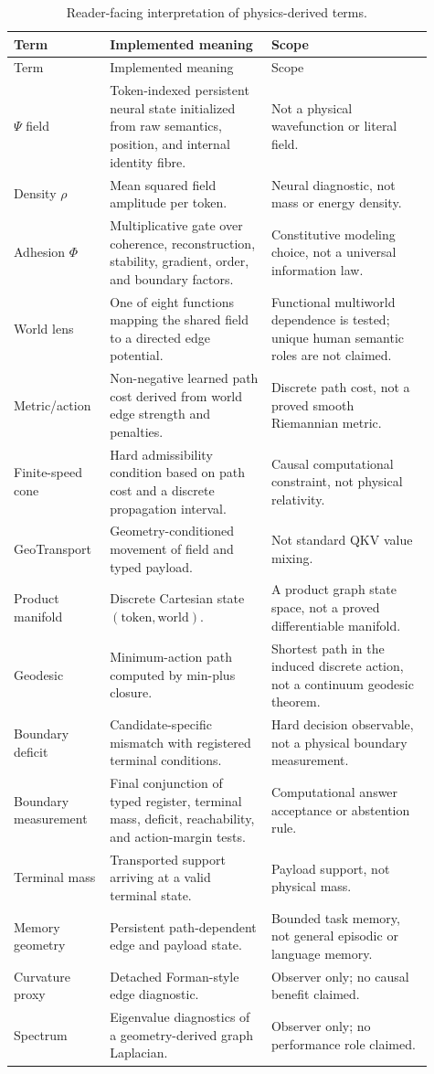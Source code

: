 \documentclass[11pt]{article}
\begin{document}
\begin{longtable}{@{}P{0.19\linewidth}P{0.36\linewidth}P{0.36\linewidth}@{}}
\caption{Reader-facing interpretation of physics-derived terms.}
\label{tab:glossary}\\
\toprule
Term & Implemented meaning & Scope \\
\midrule
\endfirsthead
\toprule
Term & Implemented meaning & Scope \\
\midrule
\endhead
$\Psi$ field & Token-indexed persistent neural state initialized from raw
semantics, position, and internal identity fibre. & Not a physical wavefunction
or literal field. \\
Density $\rho$ & Mean squared field amplitude per token. & Neural diagnostic,
not mass or energy density. \\
Adhesion $\Phi$ & Multiplicative gate over coherence, reconstruction,
stability, gradient, order, and boundary factors. & Constitutive modeling
choice, not a universal information law. \\
World lens & One of eight functions mapping the shared field to a directed edge
potential. & Functional multiworld dependence is tested; unique human semantic
roles are not claimed. \\
Metric/action & Non-negative learned path cost derived from world edge strength
and penalties. & Discrete path cost, not a proved smooth Riemannian metric. \\
Finite-speed cone & Hard admissibility condition based on path cost and a
discrete propagation interval. & Causal computational constraint, not physical
relativity. \\
GeoTransport & Geometry-conditioned movement of field and typed payload. & Not
standard QKV value mixing. \\
Product manifold & Discrete Cartesian state $(\text{token},\text{world})$. & A
product graph state space, not a proved differentiable manifold. \\
Geodesic & Minimum-action path computed by min-plus closure. & Shortest path in
the induced discrete action, not a continuum geodesic theorem. \\
Boundary deficit & Candidate-specific mismatch with registered terminal
conditions. & Hard decision observable, not a physical boundary measurement. \\
Boundary measurement & Final conjunction of typed register, terminal mass,
deficit, reachability, and action-margin tests. & Computational answer
acceptance or abstention rule. \\
Terminal mass & Transported support arriving at a valid terminal state. &
Payload support, not physical mass. \\
Memory geometry & Persistent path-dependent edge and payload state. & Bounded
task memory, not general episodic or language memory. \\
Curvature proxy & Detached Forman-style edge diagnostic. & Observer only; no
causal benefit claimed. \\
Spectrum & Eigenvalue diagnostics of a geometry-derived graph Laplacian. &
Observer only; no performance role claimed. \\
\bottomrule
\end{longtable}
\end{document}
